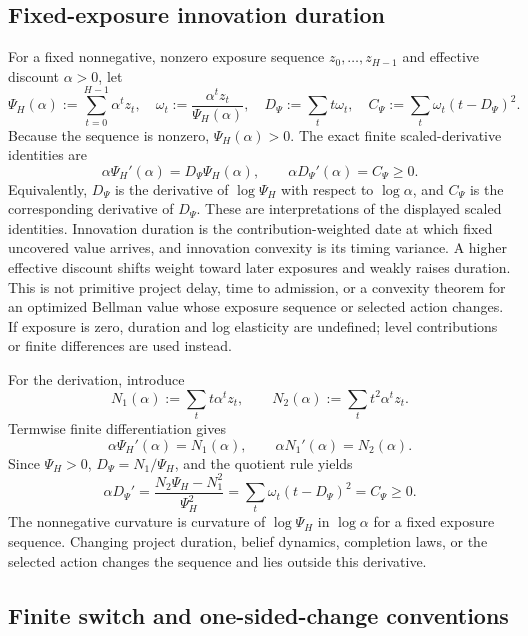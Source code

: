\subsection{Fixed-exposure innovation duration}

For a fixed nonnegative, nonzero exposure sequence
\(z_0,\ldots,z_{H-1}\) and effective discount \(\alpha>0\), let
\begin{equation}
 \Psi_H(\alpha):=\sum_{t=0}^{H-1}\alpha^tz_t,
 \quad \omega_t:=\frac{\alpha^tz_t}{\Psi_H(\alpha)},
 \quad D_\Psi:=\sum_t t\omega_t,
 \quad C_\Psi:=\sum_t\omega_t(t-D_\Psi)^2.
 \label{eq:or-innovation-potential-duration}
\end{equation}
Because the sequence is nonzero, \(\Psi_H(\alpha)>0\). The exact finite
scaled-derivative identities are
\begin{equation}
 \alpha\Psi_H'(\alpha)=D_\Psi\Psi_H(\alpha),
 \qquad
 \alpha D_\Psi'(\alpha)=C_\Psi\geq0.
 \label{eq:or-innovation-duration}
\end{equation}
Equivalently, \(D_\Psi\) is the derivative of \(\log\Psi_H\) with respect to
\(\log\alpha\), and \(C_\Psi\) is the corresponding derivative of
\(D_\Psi\). These are interpretations of the displayed scaled identities.
Innovation duration is the contribution-weighted date at which fixed
uncovered value arrives, and innovation convexity is its timing variance. A
higher effective discount shifts weight toward later exposures and weakly
raises duration. This is not primitive project delay, time to admission, or a
convexity theorem for an optimized Bellman value whose exposure sequence or
selected action changes. If exposure is zero, duration and log elasticity are
undefined; level contributions or finite differences are used instead.

For the derivation, introduce
\[
 N_1(\alpha):=\sum_t t\alpha^tz_t,
 \qquad
 N_2(\alpha):=\sum_t t^2\alpha^tz_t.
\]
Termwise finite differentiation gives
\[
 \alpha\Psi_H'(\alpha)=N_1(\alpha),
 \qquad
 \alpha N_1'(\alpha)=N_2(\alpha).
\]
Since \(\Psi_H>0\), \(D_\Psi=N_1/\Psi_H\), and the quotient rule yields
\[
 \alpha D_\Psi'
 =\frac{N_2\Psi_H-N_1^2}{\Psi_H^2}
 =\sum_t\omega_t(t-D_\Psi)^2=C_\Psi\geq0.
\]
The nonnegative curvature is curvature of \(\log\Psi_H\) in
\(\log\alpha\) for a fixed exposure sequence. Changing project duration,
belief dynamics, completion laws, or the selected action changes the sequence
and lies outside this derivative.

\subsection{Finite switch and one-sided-change conventions}

